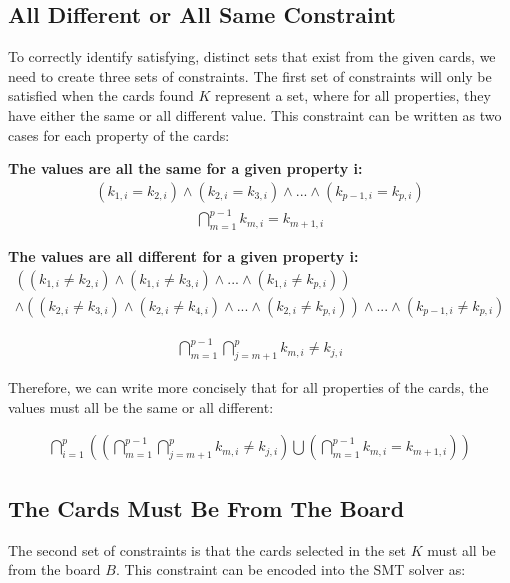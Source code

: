 \documentclass[pageno]{jpaper}
\begin{document}
\subsection{All Different or All Same Constraint}
To correctly identify satisfying, distinct sets that exist from the given cards, we need to create three sets of constraints. The first set of constraints will only be satisfied when the cards found $K$ represent a set, where for all properties, they have either the same or all different value. This constraint can be written as two cases for each property of the cards:

\textbf{The values are all the same for a given property i:} 
\begin{align}
	(k_{1,i} = k_{2,i}) \wedge (k_{2,i} = k_{3,i}) \wedge ... \wedge (k_{p-1,i} = k_{p,i})
\end{align}
\begin{align}
	\bigcap \limits_{m=1}^{p-1} k_{m,i} = k_{m+1,i}
\end{align}

\textbf{The values are all different for a given property i:}
\begin{multline}
	((k_{1,i} \neq k_{2,i}) \wedge (k_{1,i} \neq k_{3,i}) \wedge ... \wedge (k_{1,i} \neq k_{p,i})) \\
	 \wedge ((k_{2,i} \neq k_{3,i}) \wedge (k_{2,i} \neq k_{4,i}) \wedge ... \wedge (k_{2,i} \neq k_{p,i})) \wedge 
	 ... \wedge (k_{p-1,i} \neq k_{p,i})
\end{multline}

\begin{align}
	\bigcap \limits_{m=1}^{p-1}  \bigcap \limits_{j = m+1}^{p} k_{m,i} \neq k_{j,i}
\end{align}


Therefore, we can write more concisely that for all properties of the cards, the values must all be the same or all different:

\begin{align}
	\bigcap \limits_{i=1}^{p}  \left(  \left( \bigcap \limits_{m=1}^{p-1}  \bigcap \limits_{j = m+1}^{p} k_{m,i} \neq k_{j,i} \right)  \bigcup  	 \left(  \bigcap \limits_{m=1}^{p-1} k_{m,i} = k_{m+1,i} \right) \right)
\end{align}


\subsection{The Cards Must Be From The Board}

The second set of constraints is that the cards selected in the set $K$ must all be from the board $B$. This constraint can be encoded into the SMT solver as:
\end{document}

